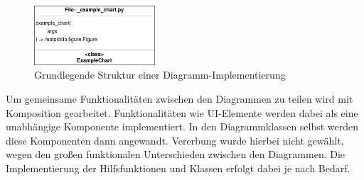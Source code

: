 \begin{figure}[H]
    \centering
    \includegraphics[width=0.4\textwidth]{images/uml_chart_design.png}
    \caption{Grundlegende Struktur einer Diagramm-Implementierung}
    \label{fig:uml_chart_design}
\end{figure}

\noindent Um gemeinsame Funktionalitäten zwischen den Diagrammen zu teilen wird mit Komposition gearbeitet. Funktionalitäten wie UI-Elemente werden dabei als eine unabhängige Komponente implementiert. In den Diagrammklassen selbst werden diese Komponenten dann angewandt. Vererbung wurde hierbei nicht gewählt, wegen den großen funktionalen Unterschieden zwischen den Diagrammen. Die Implementierung der Hilfsfunktionen und Klassen erfolgt dabei je nach Bedarf.